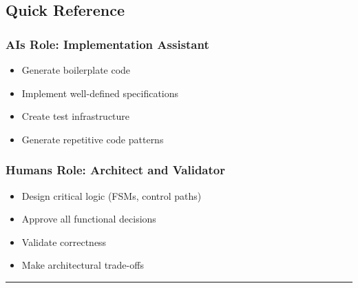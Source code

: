 \subsection{Quick Reference}\label{cr:status:phase1-ai-human-responsibilities:quick-reference}

\subsubsection{\texorpdfstring{AI\textquotesingle s Role:
\textbf{Implementation
Assistant}}{AI\textquotesingle s Role: Implementation Assistant}}\label{cr:status:phase1-ai-human-responsibilities:ais-role-implementation-assistant}

\begin{record}

\begin{itemize}
\tightlist
\item
  Generate boilerplate code
\item
  Implement well-defined specifications
\item
  Create test infrastructure
\item
  Generate repetitive code patterns
\end{itemize}

\end{record}

\subsubsection{\texorpdfstring{Human\textquotesingle s Role:
\textbf{Architect and
Validator}}{Human\textquotesingle s Role: Architect and Validator}}\label{cr:status:phase1-ai-human-responsibilities:humans-role-architect-and-validator}

\begin{record}

\begin{itemize}
\tightlist
\item
  Design critical logic (FSMs, control paths)
\item
  Approve all functional decisions
\item
  Validate correctness
\item
  Make architectural trade-offs
\end{itemize}

\begin{center}\rule{0.5\linewidth}{0.5pt}\end{center}

\end{record}

